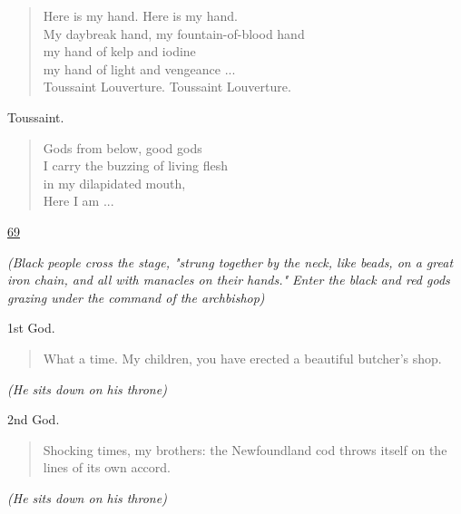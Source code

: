 \documentclass[letterpaper,article,12pt,oneside,notitlepage]{memoir}
\begin{document}
\begin{verse}
\hspace{1cm} Here is my hand. Here is my hand. \\
My daybreak hand, my fountain-of-blood hand \\
my hand of kelp and iodine \\
my hand of light and vengeance ... \\
Toussaint Louverture. Toussaint Louverture. \\
\end{verse}

\begin{center}Toussaint.\end{center}

\begin{verse}
Gods from below, good gods \\
I carry the buzzing of living flesh \\
in my dilapidated mouth, \\
Here I am ... \\
\end{verse}

\clearpage

\href{http://cesaire.elotroalex.com/chiens/chiens/p069.html}{69}

\textit{(Black people cross the stage, "strung together by the neck, like beads, on a great iron chain, and all with manacles on their hands." Enter the black and red gods grazing under the command of the archbishop)}

\begin{center}1st God.\end{center}

\begin{verse}
What a time. My children, you have erected a beautiful butcher's shop. \\
\end{verse}

\textit{(He sits down on his throne)}

\begin{center}2nd God.\end{center}

\begin{verse}
Shocking times, my brothers: the Newfoundland cod throws itself on the lines of its own accord. \\
\end{verse}

\textit{(He sits down on his throne)}
\end{document}
